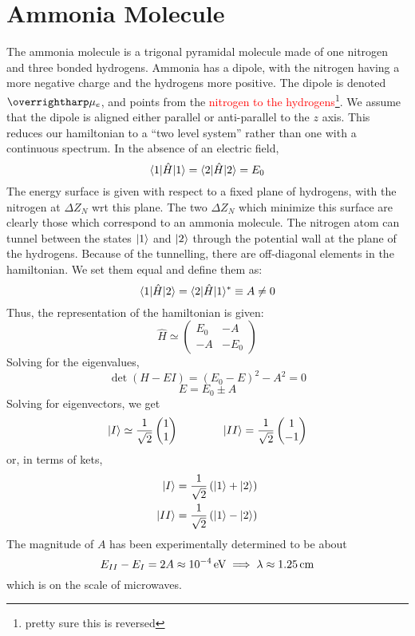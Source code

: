 \section{Ammonia Molecule}
The ammonia molecule is a trigonal pyramidal molecule made of one nitrogen and three bonded hydrogens. Ammonia has a dipole, with the nitrogen having a more negative charge and the hydrogens more positive. The dipole is denoted \(\vv{\mu}_e\), and points from the \textcolor{red}{nitrogen to the hydrogens}\footnote{pretty sure this is reversed}. We assume that the dipole is aligned either parallel or anti-parallel to the \(z\) axis. This reduces our hamiltonian to a ``two level system'' rather than one with a continuous spectrum. In the absence of an electric field,
\begin{equation}
	\langle1\rvert\hat{H}\lvert1\rangle=\langle2\rvert\hat{H}\lvert2\rangle=E_0
\end{equation}
The energy surface is given with respect to a fixed plane of hydrogens, with the nitrogen at \(\Delta Z_N\) wrt this plane. The two \(\Delta Z_N\) which minimize this surface are clearly those which correspond to an ammonia molecule. The nitrogen atom can tunnel between the states \(\lvert1\rangle\) and \(\lvert2\rangle\) through the potential wall at the plane of the hydrogens. Because of the tunnelling, there are off-diagonal elements in the hamiltonian. We set them equal and define them as:
\begin{equation}
	\b{1}\hat{H}\k{2}=\b{2}\hat{H}\k{1}\ast\equiv A\neq0
\end{equation}
Thus, the representation of the hamiltonian is given:
\begin{equation}
	\hat{H}\simeq \begin{pmatrix}
		E_0 & -A \\
		-A & -E_0
	\end{pmatrix}
\end{equation}
Solving for the eigenvalues,
\[\det(H-EI)=(E_0-E)^2-A^2=0\]
\[E=E_0\pm A\]
Solving for eigenvectors, we get
\[\lvert I\rangle\simeq \frac{1}{\sqrt{2}}\begin{pmatrix}
	1 \\ 1
\end{pmatrix} \qquad \qquad \lvert II\rangle=\frac{1}{\sqrt{2}} \begin{pmatrix}
1 \\ -1
\end{pmatrix}\]
or, in terms of kets,
\begin{subequations}
	\begin{align}
		\lvert I\rangle&=\frac{1}{\sqrt{2}}\left(\lvert1\rangle+\lvert2\rangle\right)\\
		\lvert II\rangle&=\frac{1}{\sqrt{2}}\left(\lvert1\rangle-\lvert2\rangle\right)
	\end{align}
\end{subequations}
The magnitude of \(A\) has been experimentally determined to be about
\[E_{II}-E_{I}=2A\approx\SI{e-4}{eV}\implies \lambda\approx\SI{1.25}{cm}\]
which is on the scale of microwaves.

